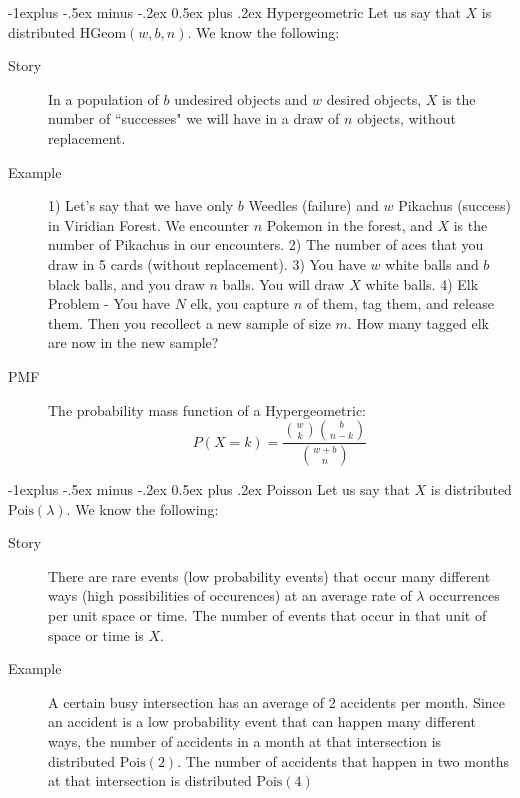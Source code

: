 \documentclass[10pt,landscape]{article}
\makeatletter
\newcommand{\Pois}{\textrm{Pois}}
\newcommand{\Hypergeometric}{\textrm{HGeom}}
\renewcommand{\subsection}{\@startsection{subsection}{2}{0mm}%
                                {-1explus -.5ex minus -.2ex}%
                                {0.5ex plus .2ex}%
                                {\normalfont\normalsize\bfseries}}
\makeatother
\begin{document}
\begin{multicols}{3}
\subsection{Hypergeometric} Let us say that $X$ is distributed $\Hypergeometric(w, b, n)$. We know the following:
\begin{description}
    \item[Story] In a population of $b$ undesired objects and $w$ desired objects, $X$ is the number of ``successes" we will have in a draw of $n$ objects, without replacement.
    \item[Example] 1) Let's say that we have only $b$ Weedles (failure) and $w$ Pikachus (success) in Viridian Forest. We encounter $n$ Pokemon in the forest, and $X$ is the number of Pikachus in our encounters. 2) The number of aces that you draw in 5 cards (without replacement). 3) You have $w$ white balls and $b$ black balls, and you draw $n$ balls. You will draw $X$ white balls. 4) Elk Problem - You have $N$ elk, you capture $n$ of them, tag them, and release them. Then you recollect a new sample of size $m$. How many tagged elk are now in the new sample?
    \item[PMF] The probability mass function of a Hypergeometric:
\[P(X = k) = \frac{{w \choose k}{b \choose n-k}}{{w + b \choose n}}\]
\end{description}

\subsection{Poisson} Let us say that $X$ is distributed $\Pois(\lambda)$. We know the following:
\begin{description}
    \item[Story] There are rare events (low probability events) that occur many different ways (high possibilities of occurences) at an average rate of $\lambda$ occurrences per unit space or time. The number of events that occur in that unit of space or time is $X$.
    
    \item[Example] A certain busy intersection has an average of 2 accidents per month. Since an accident is a low probability event that can happen many different ways, the number of accidents in a month at that intersection is distributed $\Pois(2)$. The number of accidents that happen in two months at that intersection is distributed $\Pois(4)$
    
\end{description}



\end{multicols}
\end{document}
